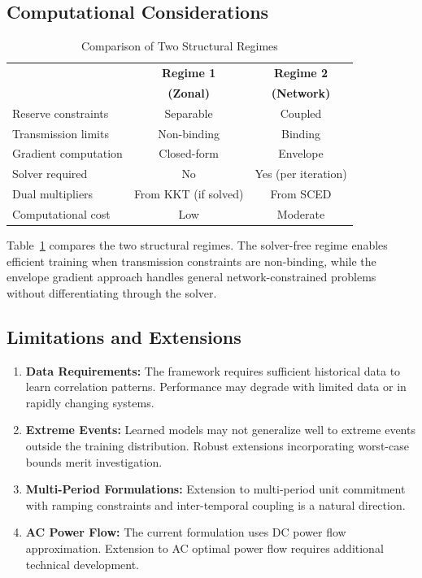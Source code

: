 \documentclass[lettersize,journal]{IEEEtran}
\theoremstyle{definition}
\begin{document}
\subsection{Computational Considerations}

\begin{table}[!t]
\caption{Comparison of Two Structural Regimes}
\label{tab:regimes}
\centering
\begin{tabular}{lcc}
\toprule
& \textbf{Regime 1} & \textbf{Regime 2} \\
& \textbf{(Zonal)} & \textbf{(Network)} \\
\midrule
Reserve constraints & Separable & Coupled \\
Transmission limits & Non-binding & Binding \\
Gradient computation & Closed-form & Envelope \\
Solver required & No & Yes (per iteration) \\
Dual multipliers & From KKT (if solved) & From SCED \\
Computational cost & Low & Moderate \\
\bottomrule
\end{tabular}
\end{table}

Table~\ref{tab:regimes} compares the two structural regimes. The solver-free regime enables efficient training when transmission constraints are non-binding, while the envelope gradient approach handles general network-constrained problems without differentiating through the solver.

\subsection{Limitations and Extensions}

\begin{enumerate}
\item \textbf{Data Requirements:} The framework requires sufficient historical data to learn correlation patterns. Performance may degrade with limited data or in rapidly changing systems.

\item \textbf{Extreme Events:} Learned models may not generalize well to extreme events outside the training distribution. Robust extensions incorporating worst-case bounds merit investigation.

\item \textbf{Multi-Period Formulations:} Extension to multi-period unit commitment with ramping constraints and inter-temporal coupling is a natural direction.

\item \textbf{AC Power Flow:} The current formulation uses DC power flow approximation. Extension to AC optimal power flow requires additional technical development.
\end{enumerate}
\end{document}
